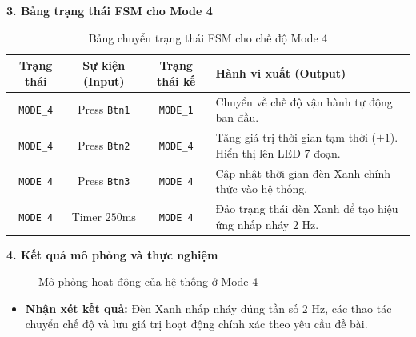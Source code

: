 \textbf{3. Bảng trạng thái FSM cho Mode 4}
\begin{table}[htbp]
    \centering
    \begin{tabular}{|c|c|c|p{6cm}|}
        \hline
        \textbf{Trạng thái} & \textbf{Sự kiện (Input)} & \textbf{Trạng thái kế} & \textbf{Hành vi xuất (Output)} \\ \hline
        \texttt{MODE\_4} & Press \texttt{Btn1} & \texttt{MODE\_1} & Chuyển về chế độ vận hành tự động ban đầu. \\ \hline
        \texttt{MODE\_4} & Press \texttt{Btn2} & \texttt{MODE\_4} & Tăng giá trị thời gian tạm thời ($+1$). Hiển thị lên LED 7 đoạn. \\ \hline
        \texttt{MODE\_4} & Press \texttt{Btn3} & \texttt{MODE\_4} & Cập nhật thời gian đèn Xanh chính thức vào hệ thống. \\ \hline
        \texttt{MODE\_4} & Timer $250\text{ms}$ & \texttt{MODE\_4} & Đảo trạng thái đèn Xanh để tạo hiệu ứng nhấp nháy $2\text{ Hz}$. \\ \hline
    \end{tabular}
    \caption{Bảng chuyển trạng thái FSM cho chế độ Mode 4}
    \label{tab:fsm_mode4}
\end{table}

\textbf{4. Kết quả mô phỏng và thực nghiệm}
\begin{figure}[htbp]
    \centering
    \caption{Mô phỏng hoạt động của hệ thống ở Mode 4}
    \label{fig:lab3_ex6}
\end{figure}

\begin{itemize}
    \item \textbf{Nhận xét kết quả:} Đèn Xanh nhấp nháy đúng tần số $2\text{ Hz}$, các thao tác chuyển chế độ và lưu giá trị hoạt động chính xác theo yêu cầu đề bài.
\end{itemize}